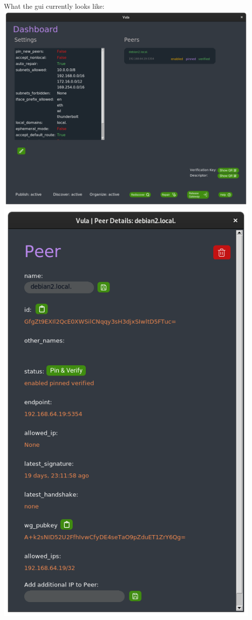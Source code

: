 \documentclass[
    type=projectproposal,
    twocolumn
]{bfhpub}
\begin{document}
\vfill

What the gui currently looks like:
\includegraphics[width=\linewidth]{./../misc/frontend/dashboard.png}
\includegraphics[width=\linewidth]{./../misc/frontend/peer.png}

\par\nointerlineskip\bfhRule
 
\end{document}
